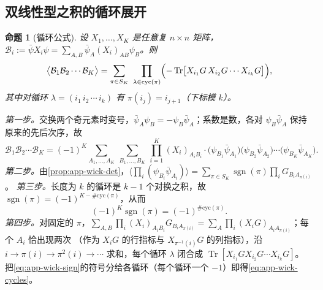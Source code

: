 \documentclass[UTF8,a4paper,11pt,fontset=fandol]{ctexart}
\makeatletter
\theoremstyle{cplain}
\newtheorem{proposition}[theorem]{命题}
\theoremstyle{cdefinition}
\theoremstyle{cremark}
\renewcommand{\proofname}{证明}
\renewenvironment{proof}[1][\proofname]{\par\pushQED{\qed}\normalfont\topsep6\p@\@plus6\p@\relax
  \trivlist\item[\hskip\labelsep\itshape #1\hspace{0.5em}]\ignorespaces}{\popQED\endtrivlist\@endpefalse}
\numberwithin{equation}{section}
\DeclareMathOperator{\Tr}{Tr}
\makeatother
\begin{document}
\subsection{双线性型之积的循环展开}\label{app:wick-cycles}

\begin{proposition}[循环公式]\label{prop:app-wick-cycles}
设 $X_1,\dots,X_K$ 是任意复 $n\times n$ 矩阵，$\mathcal B_i:=\bar\psi X_i\psi=\sum_{A,B}\bar\psi_A(X_i)_{AB}\psi_B$。则
\begin{equation}\label{eq:app-wick-cycles}
\bigl\langle\mathcal B_1\mathcal B_2\cdots\mathcal B_K\bigr\rangle=\sum_{\pi\in S_K}\ \prod_{\lambda\in\mathrm{cyc}(\pi)}\Bigl(-\Tr\bigl[X_{i_1}G\,X_{i_2}G\cdots X_{i_k}G\bigr]\Bigr),
\end{equation}
其中对循环 $\lambda=(i_1\,i_2\,\cdots\,i_k)$ 有 $\pi(i_j)=i_{j+1}$（下标模 $k$）。
\end{proposition}

\begin{proof}
\emph{第一步。}交换两个奇元素时变号，$\bar\psi_A\psi_B=-\psi_B\bar\psi_A$；系数是数，各对 $\psi_B\bar\psi_A$ 保持原来的先后次序，故
\begin{equation}\label{eq:app-wick-rewrite}
\mathcal B_1\mathcal B_2\cdots\mathcal B_K=(-1)^K\sum_{A_1,\dots,A_K}\ \sum_{B_1,\dots,B_K}\ \prod_{i=1}^K(X_i)_{A_iB_i}\cdot
\bigl(\psi_{B_1}\bar\psi_{A_1}\bigr)\bigl(\psi_{B_2}\bar\psi_{A_2}\bigr)\cdots\bigl(\psi_{B_K}\bar\psi_{A_K}\bigr).
\end{equation}
\emph{第二步。}由\cref{prop:app-wick-det}，$\bigl\langle\prod_i(\psi_{B_i}\bar\psi_{A_i})\bigr\rangle=\sum_{\pi\in S_K}\operatorname{sgn}(\pi)\prod_{i}G_{B_iA_{\pi(i)}}$。
\emph{第三步。}长度为 $k$ 的循环是 $k-1$ 个对换之积，故 $\operatorname{sgn}(\pi)=(-1)^{K-\#\mathrm{cyc}(\pi)}$，从而
\begin{equation}\label{eq:app-wick-sign}
(-1)^K\operatorname{sgn}(\pi)=(-1)^{\#\mathrm{cyc}(\pi)} .
\end{equation}
\emph{第四步。}对固定的 $\pi$，$\sum_{A,B}\prod_i(X_i)_{A_iB_i}G_{B_iA_{\pi(i)}}=\sum_A\prod_i(X_iG)_{A_iA_{\pi(i)}}$；每个 $A_i$ 恰出现两次
（作为 $X_iG$ 的行指标与 $X_{\pi^{-1}(i)}G$ 的列指标），沿 $i\to\pi(i)\to\pi^2(i)\to\cdots$ 求和，每个循环 $\lambda$ 闭合成 $\Tr[X_{i_1}GX_{i_2}G\cdots X_{i_k}G]$。
把\cref{eq:app-wick-sign}的符号分给各循环（每个循环一个 $-1$）即得\cref{eq:app-wick-cycles}。
\end{proof}
\end{document}
